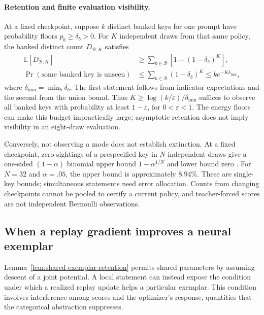 \documentclass{article}
\newcommand{\1}{\mathbf 1}
\theoremstyle{remark}
\theoremstyle{definition}
\theoremstyle{plain}
\begin{document}
\paragraph{Retention and finite evaluation visibility.}
At a fixed checkpoint, suppose $k$ distinct banked keys for one prompt have
probability floors $p_b\ge\delta_b>0$. For $K$ independent draws from that
same policy, the banked distinct count $D_{\mathcal B,K}$ satisfies
\[
 \begin{aligned}
 \mathbb E[D_{\mathcal B,K}]
 &\ge\sum_{b\in\mathcal B}\left[1-(1-\delta_b)^K\right],\\
 \Pr(\text{some banked key is unseen})
 &\le\sum_{b\in\mathcal B}(1-\delta_b)^K
 \le k e^{-K\delta_{\min}},
 \end{aligned}
\]
where $\delta_{\min}=\min_b\delta_b$. The first statement follows from
indicator expectations and the second from the union bound. Thus
$K\ge\log(k/\varepsilon)/\delta_{\min}$ suffices to observe all banked keys
with probability at least $1-\varepsilon$, for $0<\varepsilon<1$.
The energy floors can make this budget impractically large; asymptotic
retention does not imply visibility in an eight-draw evaluation.

Conversely, not observing a mode does not establish extinction. At a fixed
checkpoint, zero sightings of a prespecified key in $N$ independent draws
give a one-sided $(1-\alpha)$ binomial upper bound
$1-\alpha^{1/N}$ and lower bound zero \citep{clopper1934binomial}. For
$N=32$ and $\alpha=.05$, the upper bound is approximately $8.94\%$.
These are single-key bounds; simultaneous statements need error allocation.
Counts from changing checkpoints cannot be pooled to certify a current
policy, and teacher-forced scores are not independent Bernoulli observations.

\subsection{When a replay gradient improves a neural exemplar}
\label{app:theory-neural-replay-response}

Lemma~\ref{lem:shared-exemplar-retention} permits shared parameters by
assuming descent of a joint potential. A local statement can instead expose
the condition under which a realized replay update helps a particular
exemplar. This condition involves interference among scores and the optimizer's
response, quantities that the categorical abstraction suppresses.
\end{document}

